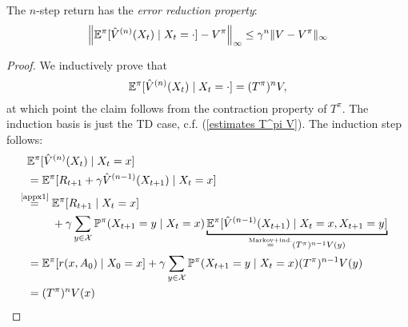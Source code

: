 \begin{lemma} The \(n\)-step return has the \emph{error reduction property}:
	\[
		\left\| \mathbb{E}^\pi[ \hat{V}^{(n)}(X_t)\mid X_t=\cdot] - V^\pi\right\|_\infty \le \gamma^n \| V-V^\pi\|_\infty
	\]
\end{lemma}
\begin{proof}
	We inductively prove that 
	\[
		\mathbb{E}^\pi[ \hat{V}^{(n)}(X_t)\mid X_t=\cdot]=(T^\pi)^n V,
	\]
	at which point the claim follows from the contraction property of \(T^\pi\). The induction basis is just the TD case, c.f. (\ref{estimates T^pi V}). The induction step follows:
	\begin{align*}
		&\E^\pi[ \hat{V}^{(n)}(X_t)\mid X_t=x]\\
		&=\E^\pi[R_{t+1}+\gamma\hat{V}^{(n-1)}(X_{t+1})\mid X_t=x]\\
		&\lxeq{\text{\ref{appx1}}}
		\begin{aligned}[t]
			&\E^\pi[R_{t+1}\mid X_t=x] \\
			&+ \gamma\sum_{y\in\cX} \Pr^\pi(X_{t+1}=y\mid X_t=x) 
			\underbracket[1pt]{\E^\pi[\hat{V}^{(n-1)}(X_{t+1})\mid X_t=x,X_{t+1}=y]}_{
				\xeq{\text{Markov+ind.}} (T^\pi)^{n-1} V(y)
			}
		\end{aligned}\\
		&=\E^\pi[r(x,A_0)\mid X_0=x] 
		+\gamma\sum_{y\in\cX} \Pr^\pi(X_{t+1}=y\mid X_t=x)(T^\pi)^{n-1} V(y)\\
		&=(T^\pi)^n V(x) \qedhere
	\end{align*}
\end{proof}

